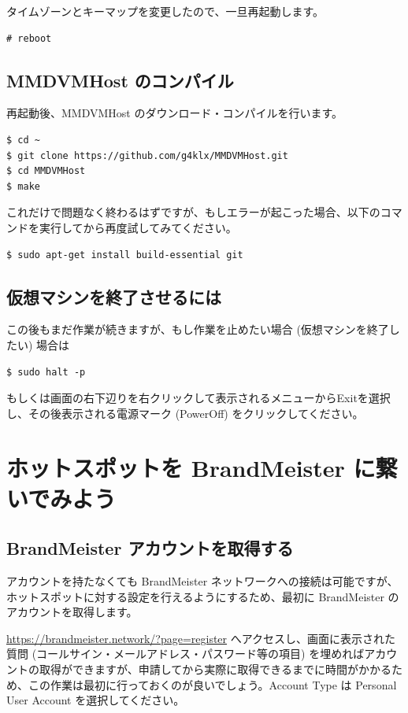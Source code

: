 \documentclass[a4j,oneside]{ujbook}
\begin{document}
タイムゾーンとキーマップを変更したので、一旦再起動します。

\begin{verbatim}
# reboot
\end{verbatim}

\section{MMDVMHost のコンパイル}

再起動後、MMDVMHost のダウンロード・コンパイルを行います。

\begin{verbatim}
$ cd ~
$ git clone https://github.com/g4klx/MMDVMHost.git
$ cd MMDVMHost
$ make
\end{verbatim}

これだけで問題なく終わるはずですが、もしエラーが起こった場合、以下のコマンドを実行してから再度試してみてください。

\begin{verbatim}
$ sudo apt-get install build-essential git
\end{verbatim}

\section{仮想マシンを終了させるには}

この後もまだ作業が続きますが、もし作業を止めたい場合 (仮想マシンを終了したい) 場合は
\begin{verbatim}
$ sudo halt -p
\end{verbatim}
もしくは画面の右下辺りを右クリックして表示されるメニューからExitを選択し、その後表示される電源マーク (PowerOff) をクリックしてください。

\chapter{ホットスポットを BrandMeister に繋いでみよう}

\section{BrandMeister アカウントを取得する}
アカウントを持たなくても BrandMeister ネットワークへの接続は可能ですが、ホットスポットに対する設定を行えるようにするため、最初に BrandMeister のアカウントを取得します。

\url{https://brandmeister.network/?page=register} へアクセスし、画面に表示された質問 (コールサイン・メールアドレス・パスワード等の項目) を埋めればアカウントの取得ができますが、申請してから実際に取得できるまでに時間がかかるため、この作業は最初に行っておくのが良いでしょう。Account Type は Personal User Account を選択してください。
\end{document}
